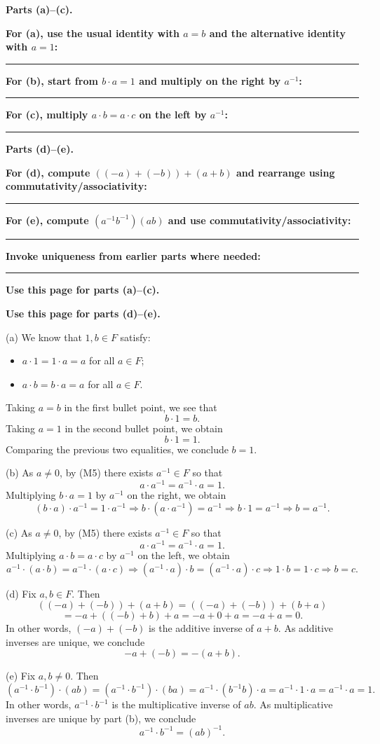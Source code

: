 \documentclass[12pt]{article}
\newcommand{\writespace}[1]{\vspace*{#1}}
\newcommand{\workquestion}[2]{%
  \par\noindent\textbf{#1}\par
  \writespace{#2}
  \noindent\rule{\linewidth}{0.35pt}\par\vspace{0.18in}%
}
\newenvironment{skeletonbox}[1]{%
  \begin{tcolorbox}[
    enhanced,
    breakable,
    colback=pass4purple,
    colframe=purple!55!black,
    fonttitle=\bfseries,
    title={Pass 4 -- Skeleton Proof\hfill #1}
  ]
}{%
  \end{tcolorbox}
}
\newcommand{\fullproofpage}[2]{%
  \begin{tcolorbox}[
    enhanced,
    colback=white,
    colframe=gray!60!black,
    fonttitle=\bfseries,
    title={Pass 5 -- Full Proof Attempt\hfill #1},
    height=8.45in
  ]
  \textbf{#2}

  \writespace{7.65in}
  \end{tcolorbox}
}
\newenvironment{solutionbox}[1]{%
  \begin{tcolorbox}[
    enhanced,
    breakable,
    colback=solgreen,
    colframe=green!45!black,
    fonttitle=\bfseries,
    title={#1}
  ]
}{%
  \end{tcolorbox}
}
\begin{document}
\newpage
\begin{skeletonbox}{Homework 3, Problem 1}
\textbf{Parts (a)--(c).}
\workquestion{For (a), use the usual identity with \(a=b\) and the alternative identity with \(a=1\):}{0.95in}
\workquestion{For (b), start from \(b\cdot a=1\) and multiply on the right by \(a^{-1}\):}{0.95in}
\workquestion{For (c), multiply \(a\cdot b=a\cdot c\) on the left by \(a^{-1}\):}{0.9in}

\textbf{Parts (d)--(e).}
\workquestion{For (d), compute \(((-a)+(-b))+(a+b)\) and rearrange using commutativity/associativity:}{1.0in}
\workquestion{For (e), compute \((a^{-1}b^{-1})(ab)\) and use commutativity/associativity:}{1.0in}
\workquestion{Invoke uniqueness from earlier parts where needed:}{0.75in}
\end{skeletonbox}

\newpage
\fullproofpage{Homework 3, Problem 1}{Use this page for parts (a)--(c).}

\newpage
\fullproofpage{Homework 3, Problem 1}{Use this page for parts (d)--(e).}

\newpage
\begin{solutionbox}{Official Solution (Professor)}
(a) We know that \(1,b\in F\) satisfy:
\begin{itemize}
  \item \(a\cdot1=1\cdot a=a\) for all \(a\in F\);
  \item \(a\cdot b=b\cdot a=a\) for all \(a\in F\).
\end{itemize}
Taking \(a=b\) in the first bullet point, we see that
\[
  b\cdot1=b.
\]
Taking \(a=1\) in the second bullet point, we obtain
\[
  b\cdot1=1.
\]
Comparing the previous two equalities, we conclude \(b=1\).

(b) As \(a\neq0\), by (M5) there exists \(a^{-1}\in F\) so that
\[
  a\cdot a^{-1}=a^{-1}\cdot a=1.
\]
Multiplying \(b\cdot a=1\) by \(a^{-1}\) on the right, we obtain
\[
  (b\cdot a)\cdot a^{-1}=1\cdot a^{-1}
  \Longrightarrow
  b\cdot(a\cdot a^{-1})=a^{-1}
  \Longrightarrow
  b\cdot1=a^{-1}
  \Longrightarrow
  b=a^{-1}.
\]

(c) As \(a\neq0\), by (M5) there exists \(a^{-1}\in F\) so that
\[
  a\cdot a^{-1}=a^{-1}\cdot a=1.
\]
Multiplying \(a\cdot b=a\cdot c\) by \(a^{-1}\) on the left, we obtain
\[
  a^{-1}\cdot(a\cdot b)=a^{-1}\cdot(a\cdot c)
  \Longrightarrow
  (a^{-1}\cdot a)\cdot b=(a^{-1}\cdot a)\cdot c
  \Longrightarrow
  1\cdot b=1\cdot c
  \Longrightarrow
  b=c.
\]

(d) Fix \(a,b\in F\). Then
\[
  ((-a)+(-b))+(a+b)
  =
  ((-a)+(-b))+(b+a)
\]
\[
  =
  -a+((-b)+b)+a
  =
  -a+0+a
  =
  -a+a
  =
  0.
\]
In other words, \((-a)+(-b)\) is the additive inverse of \(a+b\). As additive inverses are unique, we conclude
\[
  -a+(-b)=-(a+b).
\]

(e) Fix \(a,b\neq0\). Then
\[
  (a^{-1}\cdot b^{-1})\cdot(ab)
  =
  (a^{-1}\cdot b^{-1})\cdot(ba)
  =
  a^{-1}\cdot(b^{-1}b)\cdot a
  =
  a^{-1}\cdot1\cdot a
  =
  a^{-1}\cdot a
  =
  1.
\]
In other words, \(a^{-1}\cdot b^{-1}\) is the multiplicative inverse of \(ab\). As multiplicative inverses are unique by part (b), we conclude
\[
  a^{-1}\cdot b^{-1}=(ab)^{-1}.
\]
\end{solutionbox}
\end{document}
